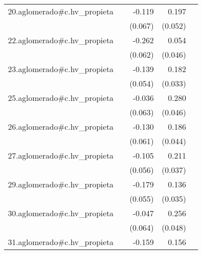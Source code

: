 {\begin{longtable}{l*{4}{D{.}{.}{-1}}}
\addlinespace
20.aglomerado#c.hv\_propieta&                     &      -0.119         &       0.197\sym{***}&                     \\
            &                     &     (0.067)         &     (0.052)         &                     \\
\addlinespace
22.aglomerado#c.hv\_propieta&                     &      -0.262\sym{***}&       0.054         &                     \\
            &                     &     (0.062)         &     (0.046)         &                     \\
\addlinespace
23.aglomerado#c.hv\_propieta&                     &      -0.139\sym{**} &       0.182\sym{***}&                     \\
            &                     &     (0.054)         &     (0.033)         &                     \\
\addlinespace
25.aglomerado#c.hv\_propieta&                     &      -0.036         &       0.280\sym{***}&                     \\
            &                     &     (0.063)         &     (0.046)         &                     \\
\addlinespace
26.aglomerado#c.hv\_propieta&                     &      -0.130\sym{*}  &       0.186\sym{***}&                     \\
            &                     &     (0.061)         &     (0.044)         &                     \\
\addlinespace
27.aglomerado#c.hv\_propieta&                     &      -0.105         &       0.211\sym{***}&                     \\
            &                     &     (0.056)         &     (0.037)         &                     \\
\addlinespace
29.aglomerado#c.hv\_propieta&                     &      -0.179\sym{**} &       0.136\sym{***}&                     \\
            &                     &     (0.055)         &     (0.035)         &                     \\
\addlinespace
30.aglomerado#c.hv\_propieta&                     &      -0.047         &       0.256\sym{***}&                     \\
            &                     &     (0.064)         &     (0.048)         &                     \\
\addlinespace
31.aglomerado#c.hv\_propieta&                     &      -0.159\sym{**} &       0.156\sym{***}&                     \\

\end{longtable}}
